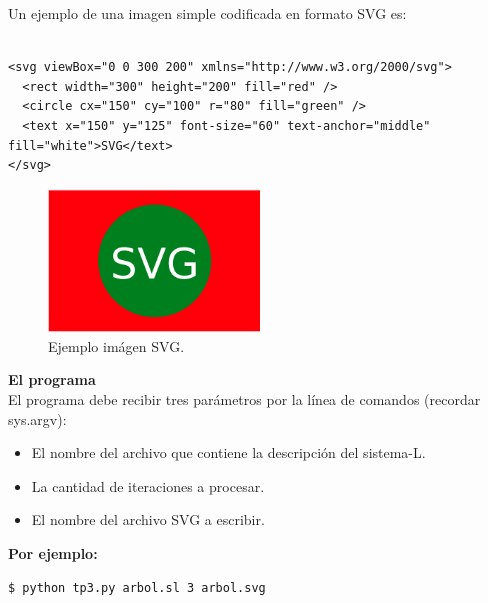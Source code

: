 \documentclass{article}
\begin{document}
\begin{description}
	Un ejemplo de una imagen simple codificada en formato SVG es:
	
	\begin{lstlisting}

<svg viewBox="0 0 300 200" xmlns="http://www.w3.org/2000/svg"> 
  <rect width="300" height="200" fill="red" />
  <circle cx="150" cy="100" r="80" fill="green" />
  <text x="150" y="125" font-size="60" text-anchor="middle" fill="white">SVG</text>
</svg>
	\end{lstlisting}

\begin{figure}[hbt!]
	\center
	\includegraphics[width=0.5\textwidth]{img/ejemplo_svg.png}
	\caption{
	\label{fig:my-label} Ejemplo im\'agen SVG. }
\end{figure}

	\item \textbf{El programa} \\[0.2cm] 

	El programa debe recibir tres par\'ametros por la l\'inea de comandos (recordar sys.argv): \\[0.1cm] 
	\begin{itemize}
		\item El nombre del archivo que contiene la descripci\'on del sistema-L.  \\
		\item La cantidad de iteraciones a procesar. \\
		\item El nombre del archivo SVG a escribir.\\
	\end{itemize}

\textbf{Por ejemplo:}	
	\begin{lstlisting}
$ python tp3.py arbol.sl 3 arbol.svg
	\end{lstlisting}

\end{description}
\end{document}
